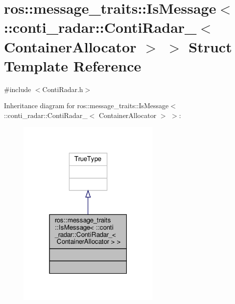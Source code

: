 \hypertarget{structros_1_1message__traits_1_1IsMessage_3_01_1_1conti__radar_1_1ContiRadar___3_01ContainerAllocator_01_4_01_4}{}\section{ros\+:\+:message\+\_\+traits\+:\+:Is\+Message$<$ \+:\+:conti\+\_\+radar\+:\+:Conti\+Radar\+\_\+$<$ Container\+Allocator $>$ $>$ Struct Template Reference}
\label{structros_1_1message__traits_1_1IsMessage_3_01_1_1conti__radar_1_1ContiRadar___3_01ContainerAllocator_01_4_01_4}


{\ttfamily \#include $<$Conti\+Radar.\+h$>$}



Inheritance diagram for ros\+:\+:message\+\_\+traits\+:\+:Is\+Message$<$ \+:\+:conti\+\_\+radar\+:\+:Conti\+Radar\+\_\+$<$ Container\+Allocator $>$ $>$\+:\nopagebreak
\begin{figure}[H]
\begin{center}
\leavevmode
\includegraphics[width=198pt]{da/d29/structros_1_1message__traits_1_1IsMessage_3_01_1_1conti__radar_1_1ContiRadar___3_01ContainerAllocator_01_4_01_4__inherit__graph}
\end{center}
\end{figure}


